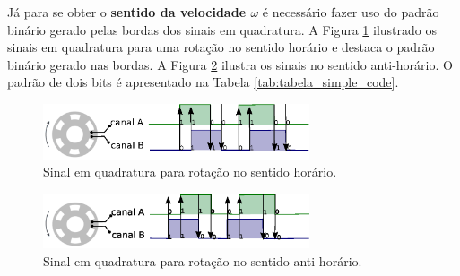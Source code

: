 Já para se obter o \textbf{sentido da velocidade $\omega$} é necessário fazer uso do padrão binário gerado pelas bordas dos sinais em quadratura. A Figura \ref{fig:cw_signal} ilustrado os sinais em quadratura para uma rotação no sentido horário e destaca o padrão binário gerado nas bordas. A Figura \ref{fig:ccw_signal} ilustra os sinais no sentido anti-horário. O padrão de dois bits é apresentado na Tabela \ref{tab:tabela_simple_code}. \\

\begin{figure}[H]
    \centering
    \includegraphics[width=0.7\textwidth]{figuras/ilustracoes/sinal_enquadratura_sentido_CW.eps}
    \caption{Sinal em quadratura para rotação no sentido horário.}
    \label{fig:cw_signal}
\end{figure}

\begin{figure}[H]
    \centering
    \includegraphics[width=0.7\textwidth]{figuras/ilustracoes/sinal_enquadratura_sentido_CCW.eps}
    \caption{Sinal em quadratura para rotação no sentido anti-horário.}
    \label{fig:ccw_signal}
\end{figure}




